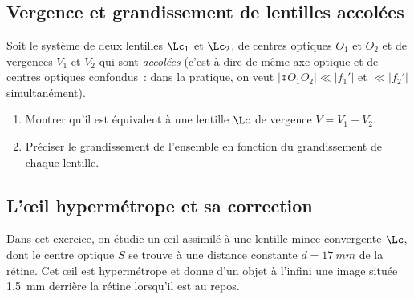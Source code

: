\documentclass[../../main/main.tex]{subfiles}
\begin{document}
\setcounter{chapter}{3}

\chapter{}

\section{Vergence et grandissement de lentilles accolées}
Soit le système de deux lentilles $\Lc_1$ et $\Lc_2$, de centres optiques
$O_1$ et $O_2$ et de vergences $V_1$ et $V_2$ qui sont \textit{accolées}
(c'est-à-dire de même axe optique et de centres optiques confondus~: dans la
pratique, on veut $|\obar{O_1O_2}| \ll |f_1'|$ et $\ll |f_2'|$ simultanément).

\begin{enumerate}
	\item Montrer qu'il est équivalent à une lentille $\Lc$ de vergence $V = V_1
		      + V_2$.
	\item Préciser le grandissement de l'ensemble en fonction du grandissement
	      de chaque lentille.
\end{enumerate}

\section{L'œil hypermétrope et sa correction}

Dans cet exercice, on étudie un œil assimilé à une lentille mince convergente
$\Lc$, dont le centre optique $S$ se trouve à une distance constante $d =
	\SI{17}{mm}$ de la rétine. Cet œil est hypermétrope et donne d'un objet à
l'infini une image située \SI{1.5}{mm} derrière la rétine lorsqu'il est au repos.
\end{document}
